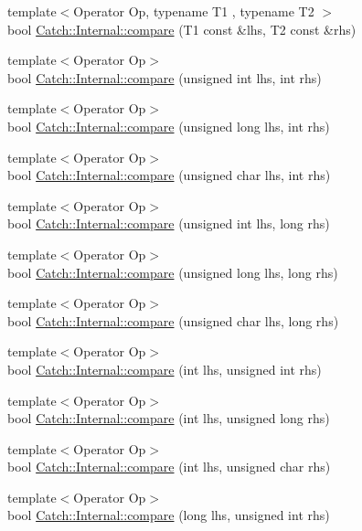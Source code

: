 \begin{DoxyCompactItemize}
\item 
{\footnotesize template$<$Operator Op, typename T1 , typename T2 $>$ }\\bool \hyperlink{a00120_a64ae04769c4583b9d4027c792b496c7d}{Catch\+::\+Internal\+::compare} (T1 const \&lhs, T2 const \&rhs)
\item 
{\footnotesize template$<$Operator Op$>$ }\\bool \hyperlink{a00120_a171aec1826898b877980a2b15fe5f735}{Catch\+::\+Internal\+::compare} (unsigned int lhs, int rhs)
\item 
{\footnotesize template$<$Operator Op$>$ }\\bool \hyperlink{a00120_aa2698c33ec87b16aff5c844165483a7a}{Catch\+::\+Internal\+::compare} (unsigned long lhs, int rhs)
\item 
{\footnotesize template$<$Operator Op$>$ }\\bool \hyperlink{a00120_ad68724393ee3d7629001a2997f6134cc}{Catch\+::\+Internal\+::compare} (unsigned char lhs, int rhs)
\item 
{\footnotesize template$<$Operator Op$>$ }\\bool \hyperlink{a00120_ac2af7b6757f9bb3539bb78acff5c4649}{Catch\+::\+Internal\+::compare} (unsigned int lhs, long rhs)
\item 
{\footnotesize template$<$Operator Op$>$ }\\bool \hyperlink{a00120_ace20062a489a8a7049fe224d62e644a7}{Catch\+::\+Internal\+::compare} (unsigned long lhs, long rhs)
\item 
{\footnotesize template$<$Operator Op$>$ }\\bool \hyperlink{a00120_a640e0cce9260a912842bee58db501dc5}{Catch\+::\+Internal\+::compare} (unsigned char lhs, long rhs)
\item 
{\footnotesize template$<$Operator Op$>$ }\\bool \hyperlink{a00120_a17c92ed4b6d88a9f8bbcbc52544fe40f}{Catch\+::\+Internal\+::compare} (int lhs, unsigned int rhs)
\item 
{\footnotesize template$<$Operator Op$>$ }\\bool \hyperlink{a00120_aac7a6452ed0d324031ceb7b4f3a3b61c}{Catch\+::\+Internal\+::compare} (int lhs, unsigned long rhs)
\item 
{\footnotesize template$<$Operator Op$>$ }\\bool \hyperlink{a00120_a7e82d987f62b9822107027c72a55fa6b}{Catch\+::\+Internal\+::compare} (int lhs, unsigned char rhs)
\item 
{\footnotesize template$<$Operator Op$>$ }\\bool \hyperlink{a00120_a0b4783ede1901e5c1baf8ff909bcce8d}{Catch\+::\+Internal\+::compare} (long lhs, unsigned int rhs)

\end{DoxyCompactItemize}
